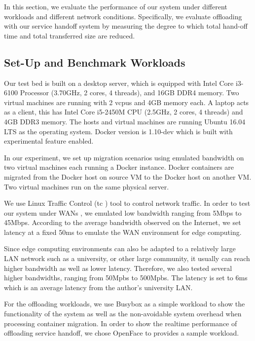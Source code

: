 
In this section, we evaluate the performance of our system under different workloads and different network conditions. 
Specifically, we evaluate offloading with our service handoff system by measuring the degree to which total hand-off time and total transferred size are reduced.

\subsection{Set-Up and Benchmark Workloads}

Our test bed is built on a desktop server, which is equipped with Intel Core i3-6100 Processor (3.70GHz, 2 cores, 4 threads), and 16GB DDR4 memory. Two virtual machines are running with 2 vcpus and 4GB memory each.
A laptop acts as a client, this has Intel Core i5-2450M CPU (2.5GHz, 2 cores, 4 threads) and 4GB DDR3 memory. 
The hosts and virtual machines are running Ubuntu 16.04 LTS as the operating system. Docker version is 1.10-dev which is built with experimental feature enabled.

In our experiment, we set up migration scenarios using 
emulated bandwidth on two virtual machines each running a Docker instance.
Docker containers are migrated from the Docker host on source VM to the Docker host on another VM. 
Two virtual machines run on the same physical server. 

We use Linux Traffic Control (tc\cite{tc} )  tool to control network traffic. In order to test our system under WANs , we emulated low bandwidth ranging from 5Mbps to 45Mbps. According to the average bandwidth observed on the Internet\cite{internet2014state}, we set  latency at a fixed 50ms to emulate the WAN environment for edge computing.

Since edge computing environments can also be adapted to a relatively large LAN network such as a university, or other large community, it usually can reach higher bandwidth as well as lower latency. Therefore, we also tested several higher bandwidths, ranging from 50Mpbs to 500Mpbs. The latency is set to 6ms which is an average latency from the author's university LAN.

For the offloading workloads, we use Busybox as a simple workload to show the functionality of the system as well as the non-avoidable system overhead when processing container migration. In order to show the realtime performance of offloading service handoff, we chose OpenFace to provides a sample workload.

